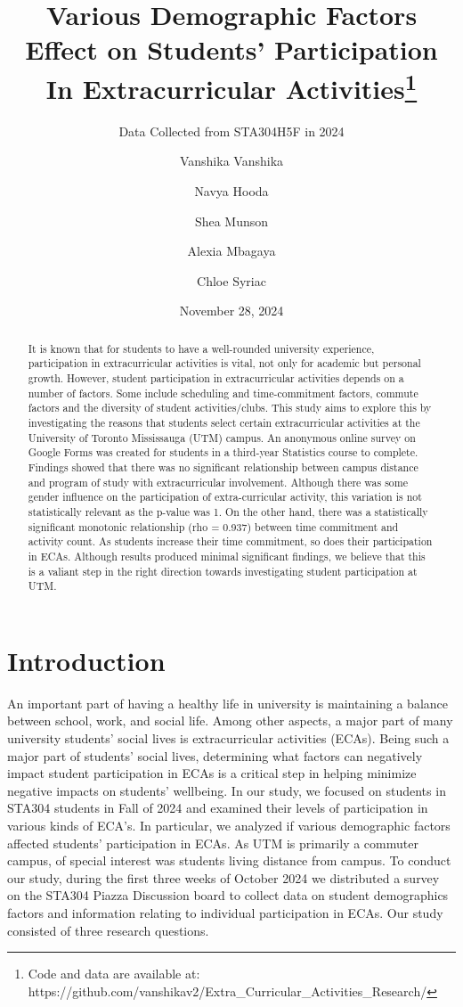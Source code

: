 \documentclass[
  letterpaper,
  DIV=11,
  numbers=noendperiod]{scrartcl}
\title{Various Demographic Factors Effect on Students' Participation In
Extracurricular Activities\thanks{Code and data are available at:
https://github.com/vanshikav2/Extra\_Curricular\_Activities\_Research/}}
\subtitle{Data Collected from STA304H5F in 2024}
\author{Vanshika Vanshika \and Navya Hooda \and Shea Munson \and Alexia
Mbagaya \and Chloe Syriac}
\date{November 28, 2024}
\renewcommand*\contentsname{Table of contents}
\newcommand\contentsname{Table of contents}
\begin{document}
\maketitle
\begin{abstract}
It is known that for students to have a well-rounded university
experience, participation in extracurricular activities is vital, not
only for academic but personal growth. However, student participation in
extracurricular activities depends on a number of factors. Some include
scheduling and time-commitment factors, commute factors and the
diversity of student activities/clubs. This study aims to explore this
by investigating the reasons that students select certain
extracurricular activities at the University of Toronto Mississauga
(UTM) campus. An anonymous online survey on Google Forms was created for
students in a third-year Statistics course to complete. Findings showed
that there was no significant relationship between campus distance and
program of study with extracurricular involvement. Although there was
some gender influence on the participation of extra-curricular activity,
this variation is not statistically relevant as the p-value was 1. On
the other hand, there was a statistically significant monotonic
relationship (rho = 0.937) between time commitment and activity count.
As students increase their time commitment, so does their participation
in ECAs. Although results produced minimal significant findings, we
believe that this is a valiant step in the right direction towards
investigating student participation at UTM.
\end{abstract}

\renewcommand*\contentsname{Table of contents}
{
\hypersetup{linkcolor=}
\setcounter{tocdepth}{3}
\tableofcontents
}
\section{Introduction}\label{introduction}

An important part of having a healthy life in university is maintaining
a balance between school, work, and social life. Among other aspects, a
major part of many university students' social lives is extracurricular
activities (ECAs). Being such a major part of students' social lives,
determining what factors can negatively impact student participation in
ECAs is a critical step in helping minimize negative impacts on
students' wellbeing. In our study, we focused on students in STA304
students in Fall of 2024 and examined their levels of participation in
various kinds of ECA's. In particular, we analyzed if various
demographic factors affected students' participation in ECAs. As UTM is
primarily a commuter campus, of special interest was students living
distance from campus. To conduct our study, during the first three weeks
of October 2024 we distributed a survey on the STA304 Piazza Discussion
board to collect data on student demographics factors and information
relating to individual participation in ECAs. Our study consisted of
three research questions.
\end{document}
